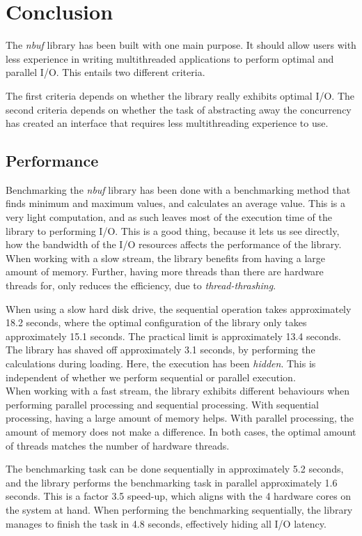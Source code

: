\documentclass[a4paper]{article}
\newcommand{\nbuf}{\textit{nbuf} }
\begin{document}
\newpage
\section{Conclusion}
The \nbuf library has been built with one main purpose. It should allow users with less experience in writing multithreaded applications to perform optimal and parallel I/O. This entails two different criteria. 

The first criteria depends on whether the library really exhibits optimal I/O. The second criteria depends on whether the task of abstracting away the concurrency has created an interface that requires less multithreading experience to use.


\subsection{Performance}
Benchmarking the \nbuf library has been done with a benchmarking method that finds minimum and maximum values, and calculates an average value. This is a very light computation, and as such leaves most of the execution time of the library to performing I/O. This is a good thing, because it lets us see directly, how the bandwidth of the I/O resources affects the performance of the library.\\

When working with a slow stream, the library benefits from having a large amount of memory. Further, having more threads than there are hardware threads for, only reduces the efficiency, due to \textit{thread-thrashing}. 

When using a slow hard disk drive, the sequential operation takes approximately 18.2 seconds, where the optimal configuration of the library only takes approximately 15.1 seconds. The practical limit is approximately 13.4 seconds. The library has shaved off approximately 3.1 seconds, by performing the calculations during loading. Here, the execution has been \textit{hidden}. This is independent of whether we perform sequential or parallel execution.\\

When working with a fast stream, the library exhibits different behaviours when performing parallel processing and sequential processing. With sequential processing, having a large amount of memory helps. With parallel processing, the amount of memory does not make a difference. In both cases, the optimal amount of threads matches the number of hardware threads. 

The benchmarking task can be done sequentially in approximately 5.2 seconds, and the library performs the benchmarking task in parallel approximately 1.6 seconds. This is a factor 3.5 speed-up, which aligns with the 4 hardware cores on the system at hand. When performing the benchmarking sequentially, the library manages to finish the task in 4.8 seconds, effectively hiding all I/O latency.\\
\end{document}
